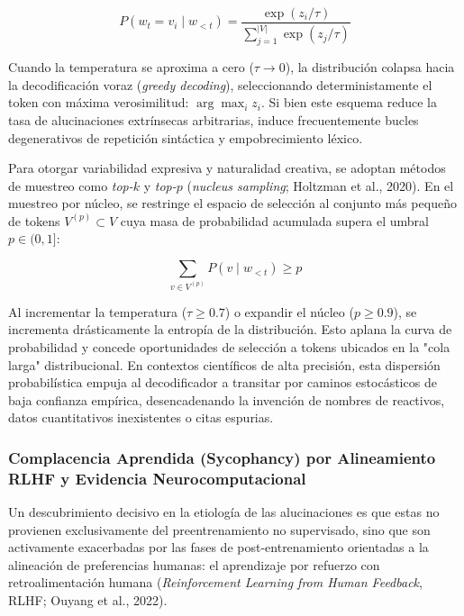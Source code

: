 \begin{equation}
P(w_t = v_i \mid w_{<t}) = \frac{\exp(z_i / \tau)}{\sum_{j=1}^{|V|} \exp(z_j / \tau)}
\end{equation}

Cuando la temperatura se aproxima a cero ($\tau \to 0$), la distribución colapsa hacia la decodificación voraz (\textit{greedy decoding}), seleccionando deterministamente el token con máxima verosimilitud: $\arg\max_i z_i$. Si bien este esquema reduce la tasa de alucinaciones extrínsecas arbitrarias, induce frecuentemente bucles degenerativos de repetición sintáctica y empobrecimiento léxico.

Para otorgar variabilidad expresiva y naturalidad creativa, se adoptan métodos de muestreo como \textit{top-$k$} y \textit{top-$p$} (\textit{nucleus sampling}; Holtzman et al., 2020). En el muestreo por núcleo, se restringe el espacio de selección al conjunto más pequeño de tokens $V^{(p)} \subset V$ cuya masa de probabilidad acumulada supera el umbral $p \in (0, 1]$:

\begin{equation}
\sum_{v \in V^{(p)}} P(v \mid w_{<t}) \ge p
\end{equation}

Al incrementar la temperatura ($\tau \ge 0.7$) o expandir el núcleo ($p \ge 0.9$), se incrementa drásticamente la entropía de la distribución. Esto aplana la curva de probabilidad y concede oportunidades de selección a tokens ubicados en la "cola larga" distribucional. En contextos científicos de alta precisión, esta dispersión probabilística empuja al decodificador a transitar por caminos estocásticos de baja confianza empírica, desencadenando la invención de nombres de reactivos, datos cuantitativos inexistentes o citas espurias.

\subsubsection{Complacencia Aprendida (Sycophancy) por Alineamiento RLHF y Evidencia Neurocomputacional}

Un descubrimiento decisivo en la etiología de las alucinaciones es que estas no provienen exclusivamente del preentrenamiento no supervisado, sino que son activamente exacerbadas por las fases de post-entrenamiento orientadas a la alineación de preferencias humanas: el aprendizaje por refuerzo con retroalimentación humana (\textit{Reinforcement Learning from Human Feedback}, RLHF; Ouyang et al., 2022).

